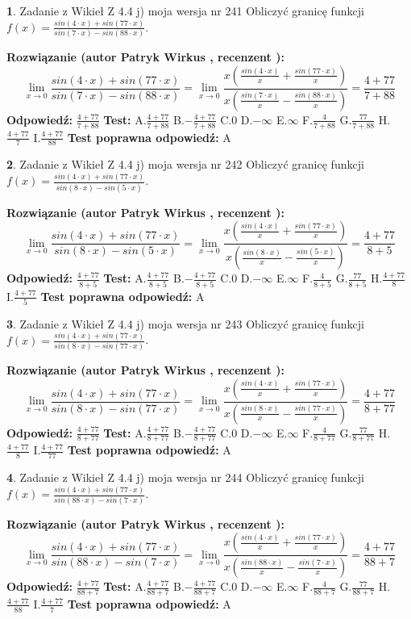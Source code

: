 \documentclass[12pt, a4paper]{article}
\theoremstyle{definition} %
\newtheorem{zad}{}
\newcommand{\zadStart}[1]{\begin{zad}#1\newline}
\newcommand{\zadStop}{\end{zad}}
\newcommand{\rozwStart}[2]{\noindent \textbf{Rozwiązanie (autor #1 , recenzent #2): }\newline}
\newcommand{\rozwStop}{\newline}
\newcommand{\odpStart}{\noindent \textbf{Odpowiedź:}\newline}
\newcommand{\odpStop}{\newline}
\newcommand{\testStart}{\noindent \textbf{Test:}\newline}
\newcommand{\testStop}{\newline}
\newcommand{\kluczStart}{\noindent \textbf{Test poprawna odpowiedź:}\newline}
\newcommand{\kluczStop}{\newline}
\begin{document}
\zadStart{Zadanie z Wikieł Z 4.4 j) moja wersja nr 241}
Obliczyć granicę funkcji $f(x)=\frac{sin(4\cdot x) +sin(77\cdot x)}{sin(7\cdot x) -sin(88\cdot x)}$.
\zadStop
\rozwStart{Patryk Wirkus}{}
$$\lim\limits_{x\to 0}\frac{sin(4\cdot x) +sin(77\cdot x)}{sin(7\cdot x) -sin(88\cdot x)}=\lim\limits_{x\to 0}\frac{x(\frac{sin(4\cdot x)}{x}+\frac{sin(77\cdot x)}{x})}{x(\frac{sin(7\cdot x)}{x}-\frac{sin(88\cdot x)}{x})}=\frac{4+77}{7+88}$$
\rozwStop
\odpStart
$\frac{4+77}{7+88}$
\odpStop
\testStart
A.$\frac{4+77}{7+88}$
B.$-\frac{4+77}{7+88}$
C.$0$
D.$-\infty$
E.$\infty$
F.$\frac{4}{7+88}$
G.$\frac{77}{7+88}$
H.$\frac{4+77}{7}$
I.$\frac{4+77}{88}$
\testStop
\kluczStart
A
\kluczStop



\zadStart{Zadanie z Wikieł Z 4.4 j) moja wersja nr 242}
Obliczyć granicę funkcji $f(x)=\frac{sin(4\cdot x) +sin(77\cdot x)}{sin(8\cdot x) -sin(5\cdot x)}$.
\zadStop
\rozwStart{Patryk Wirkus}{}
$$\lim\limits_{x\to 0}\frac{sin(4\cdot x) +sin(77\cdot x)}{sin(8\cdot x) -sin(5\cdot x)}=\lim\limits_{x\to 0}\frac{x(\frac{sin(4\cdot x)}{x}+\frac{sin(77\cdot x)}{x})}{x(\frac{sin(8\cdot x)}{x}-\frac{sin(5\cdot x)}{x})}=\frac{4+77}{8+5}$$
\rozwStop
\odpStart
$\frac{4+77}{8+5}$
\odpStop
\testStart
A.$\frac{4+77}{8+5}$
B.$-\frac{4+77}{8+5}$
C.$0$
D.$-\infty$
E.$\infty$
F.$\frac{4}{8+5}$
G.$\frac{77}{8+5}$
H.$\frac{4+77}{8}$
I.$\frac{4+77}{5}$
\testStop
\kluczStart
A
\kluczStop



\zadStart{Zadanie z Wikieł Z 4.4 j) moja wersja nr 243}
Obliczyć granicę funkcji $f(x)=\frac{sin(4\cdot x) +sin(77\cdot x)}{sin(8\cdot x) -sin(77\cdot x)}$.
\zadStop
\rozwStart{Patryk Wirkus}{}
$$\lim\limits_{x\to 0}\frac{sin(4\cdot x) +sin(77\cdot x)}{sin(8\cdot x) -sin(77\cdot x)}=\lim\limits_{x\to 0}\frac{x(\frac{sin(4\cdot x)}{x}+\frac{sin(77\cdot x)}{x})}{x(\frac{sin(8\cdot x)}{x}-\frac{sin(77\cdot x)}{x})}=\frac{4+77}{8+77}$$
\rozwStop
\odpStart
$\frac{4+77}{8+77}$
\odpStop
\testStart
A.$\frac{4+77}{8+77}$
B.$-\frac{4+77}{8+77}$
C.$0$
D.$-\infty$
E.$\infty$
F.$\frac{4}{8+77}$
G.$\frac{77}{8+77}$
H.$\frac{4+77}{8}$
I.$\frac{4+77}{77}$
\testStop
\kluczStart
A
\kluczStop



\zadStart{Zadanie z Wikieł Z 4.4 j) moja wersja nr 244}
Obliczyć granicę funkcji $f(x)=\frac{sin(4\cdot x) +sin(77\cdot x)}{sin(88\cdot x) -sin(7\cdot x)}$.
\zadStop
\rozwStart{Patryk Wirkus}{}
$$\lim\limits_{x\to 0}\frac{sin(4\cdot x) +sin(77\cdot x)}{sin(88\cdot x) -sin(7\cdot x)}=\lim\limits_{x\to 0}\frac{x(\frac{sin(4\cdot x)}{x}+\frac{sin(77\cdot x)}{x})}{x(\frac{sin(88\cdot x)}{x}-\frac{sin(7\cdot x)}{x})}=\frac{4+77}{88+7}$$
\rozwStop
\odpStart
$\frac{4+77}{88+7}$
\odpStop
\testStart
A.$\frac{4+77}{88+7}$
B.$-\frac{4+77}{88+7}$
C.$0$
D.$-\infty$
E.$\infty$
F.$\frac{4}{88+7}$
G.$\frac{77}{88+7}$
H.$\frac{4+77}{88}$
I.$\frac{4+77}{7}$
\testStop
\kluczStart
A
\kluczStop
\end{document}
